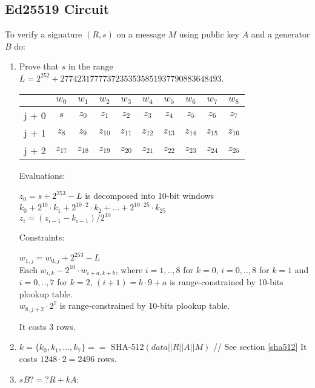 \subsection{Ed25519 Circuit}
\label{section:eddsa}
 
To verify a signature $(R,s)$ on a message $M$ using public key $A$ and a generator $B$ do:
\begin{enumerate}
    \item Prove that $s$ in the range $L = 2^{252}+27742317777372353535851937790883648493$.
        \begin{center}
    \begin{tabular}{ c|c|c|c|c|c|c|c|c|c }
        & $w_0$  & $w_1$  & $w_2$  & $w_3$  & $w_4$  & $w_5$ & $w_6$ & $w_7$ & $w_8$  \\
            \hline
                j + 0 & $s$ & $z_0$ & $z_1$ & $z_2$ & $z_3$ & $z_4$ & $z_5$ & $z_6$ & $z_7$ \\
                j + 1 & $z_8$ & $z_{9}$ & $z_{10}$ & $z_{11}$ & $z_{12}$ & $z_{13}$ & $z_{14}$ & $z_{15}$ & $z_{16}$ \\
                j + 2 & $z_{17}$ & $z_{18}$ & $z_{19}$ & $z_{20}$ & $z_{21}$ & $z_{22}$ & $z_{23}$ & $z_{24}$ & $z_{25}$ \\
            \end{tabular}
        \end{center}
        Evaluations:
        \begin{center}
        $z_0 = s + 2^{253} - L$ is decomposed into 10-bit windows $k_0 + 2^{10} \cdot k_1 + 2^{10 \cdot 2} \cdot k_2 + ... + 2^{10 \cdot 25} \cdot k_{25}$ \\
        $z_i = (z_{i - 1} - k_{i - 1}) / 2^{10}$
        \end{center}
        Constraints:
        \begin{center}
            $w_{1, j} = w_{0,j} + 2^{253} - L $ \\
            Each $w_{i,k} - 2^{10} \cdot w_{i + a, k + b} $, where $i = 1,..,8$ for $k = 0$, $i = 0,..,8$ for $k = 1$ and $i = 0,..,7$ for $k = 2$, $(i + 1) = b \cdot 9 + a$  is range-constrained by 10-bits plookup table. \\
            $w_{8,j+2} \cdot 2^7 $ is range-constrained by 10-bits plookup table.
        \end{center}
	It costs $3$ rows.
    \item $k = \{k_0, k _1, ..., k_7 \} == $ SHA-512$(data||R||A||M)$ // See section \ref{sha512}
    It costs $1248 \cdot 2 = 2496$ rows.
    \item $sB ?=? R + kA$:

\end{enumerate}
